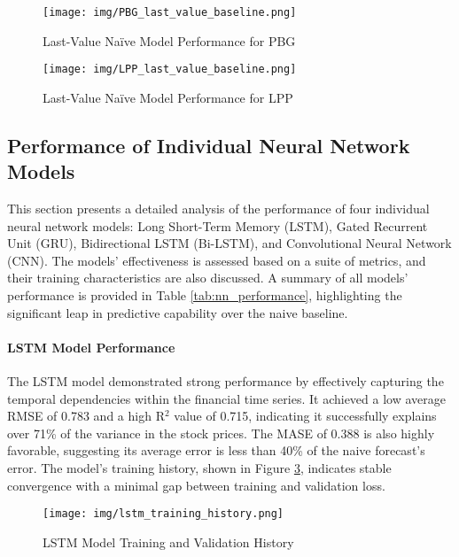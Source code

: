 \begin{figure}[h!]
    \centering
    \texttt{[image: img/PBG\_last\_value\_baseline.png]}
    \caption{Last-Value Naïve Model Performance for PBG}
    \label{fig:pbg_last_value_baseline}
\end{figure}

\begin{figure}[h!]
    \centering
    \texttt{[image: img/LPP\_last\_value\_baseline.png]}
    \caption{Last-Value Naïve Model Performance for LPP}
    \label{fig:lpp_last_value_baseline}
\end{figure}


\subsection{Performance of Individual Neural Network Models}
This section presents a detailed analysis of the performance of four individual neural network models: Long Short-Term Memory (LSTM), Gated Recurrent Unit (GRU), Bidirectional LSTM (Bi-LSTM), and Convolutional Neural Network (CNN). The models' effectiveness is assessed based on a suite of metrics, and their training characteristics are also discussed. A summary of all models' performance is provided in Table \ref{tab:nn_performance}, highlighting the significant leap in predictive capability over the naive baseline.

\paragraph{LSTM Model Performance}
The LSTM model demonstrated strong performance by effectively capturing the temporal dependencies within the financial time series. It achieved a low average RMSE of 0.783 and a high R$^2$ value of 0.715, indicating it successfully explains over 71\% of the variance in the stock prices. The MASE of 0.388 is also highly favorable, suggesting its average error is less than 40\% of the naive forecast's error. The model's training history, shown in Figure \ref{fig:lstm_training_history}, indicates stable convergence with a minimal gap between training and validation loss.
\begin{figure}[h!]
\centering
\texttt{[image: img/lstm\_training\_history.png]}
\caption{LSTM Model Training and Validation History}
\label{fig:lstm_training_history}
\end{figure}

